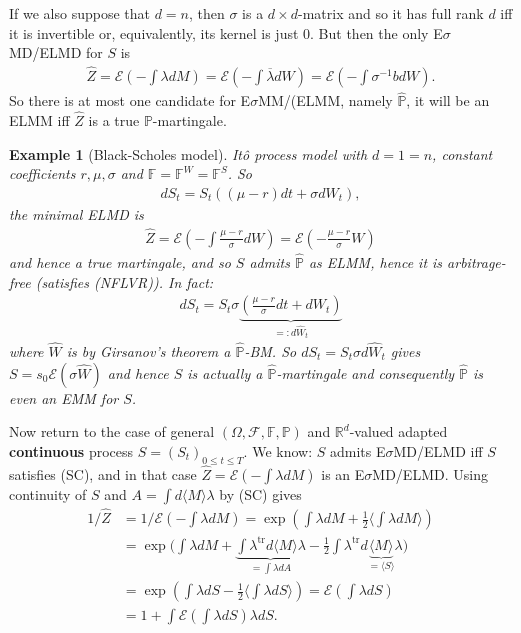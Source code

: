 \documentclass[12pt,a4paper, twoside]{article}
\newtheorem{exmp}{Example}[section]
\theoremstyle{definition}
\newcommand{\PP}{\mathbb{P}} %
\begin{document}
If we also suppose that $d=n$, then $\sigma$ is a $d \times d$-matrix and so it has full rank $d$ iff it is invertible or, equivalently, its kernel is just $0$. But then the only E$\sigma$MD/ELMD for $S$ is 
\begin{align*}
\hat{Z}= \mathcal{E} \left( - \int \lambda dM \right) = \mathcal{E}\left( - \int \overline{\lambda}dW \right) = \mathcal{E} \left( - \int \sigma^{-1} b dW \right). 
\end{align*}
So there is at most one candidate for E$\sigma$MM/(ELMM, namely $\hat{\PP}$, it will be an ELMM iff $\hat{Z}$ is a true $\PP$-martingale. 
\begin{exmp}[Black-Scholes model] Itô process model with $d=1=n$, constant coefficients $r, \mu, \sigma$ and $\mathbb{F}= \mathbb{F}^W= \mathbb{F}^S$. So 
\begin{align*}
dS_t = S_t(( \mu-r)dt + \sigma dW_t),
\end{align*}
the minimal ELMD is \begin{align*}
\hat{Z}= \mathcal{E}\left( - \int \frac{\mu-r}{\sigma}dW \right) = \mathcal{E} \left( - \frac{\mu-r}{\sigma}W \right)
\end{align*}
and hence a true martingale, and so $S$ admits $\hat{\PP}$ as ELMM, hence it is arbitrage-free (satisfies (NFLVR)). In fact: 
\begin{align*}
dS_t = S_t \sigma \underbrace{\left( \frac{\mu-r}{\sigma}dt + dW_t \right)}_{=: d \widehat{W}_t}
\end{align*}
where $\widehat{W}$ is by Girsanov's theorem a $\hat{\PP}$-BM. So $dS_t= S_t \sigma d\widehat{W}_t$ gives $S= s_0 \mathcal{E}( \sigma \widehat{W})$ and hence $S$ is actually a $\hat{\PP}$-martingale and consequently $\hat{\PP}$ is even an EMM for $S$. 
\end{exmp}
\newpage
Now return to the case of general $( \Omega, \mathcal{F}, \mathbb{F}, \PP)$ and $\mathbb{R}^d$-valued adapted \textbf{continuous} process $S=(S_t)_{0 \leq t \leq T}$. We know: $S$ admits E$\sigma$MD/ELMD iff $S$ satisfies (SC), and in that case $\hat{Z}= \mathcal{E}( - \int \lambda dM)$ is an E$\sigma$MD/ELMD. Using continuity of $S$ and $A= \int d \langle M \rangle \lambda$ by (SC) gives 
\begin{align*}
1/ \hat{Z}&= 1/ \mathcal{E} \left( - \int \lambda dM \right) = \exp \left( \int \lambda dM + \frac{1}{2} \langle \int \lambda dM \rangle \right) \\
&= \exp \Big( \int \lambda dM + \underbrace{\int \lambda^\text{tr}d \langle M \rangle \lambda}_{= \int \lambda dA} - \frac{1}{2} \int \lambda^\text{tr} d \underbrace{\langle M \rangle }_{= \langle S \rangle} \lambda \Big) \\
& =\exp \left( \int \lambda dS - \frac{1}{2} \langle \int \lambda dS \rangle \right) = \mathcal{E}\left( \int \lambda dS \right) \\
&= 1 + \int \mathcal{E} \left( \int \lambda dS \right) \lambda dS.
\end{align*}
\end{document}
